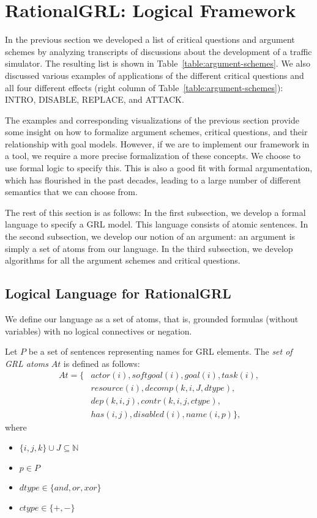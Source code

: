 \section{RationalGRL: Logical Framework}
\label{sect:formalframework}

In the previous section we developed a list of critical questions and argument schemes by analyzing transcripts of discussions about the development of a traffic simulator. The resulting list is shown in Table~\ref{table:argument-schemes}. We also discussed various examples of applications of the different critical questions and all four different effects (right column of Table~\ref{table:argument-schemes}): \textsf{INTRO}, \textsf{DISABLE}, \textsf{REPLACE}, and \textsf{ATTACK}.

The examples and corresponding visualizations of the previous section provide some insight on how to formalize argument schemes, critical questions, and their relationship with goal models. However, if we are to implement our framework in a tool, we require a more precise formalization of these concepts.  We choose to use formal logic to specify this. This is also a good fit with formal argumentation, which has flourished in the past decades, leading to a large number of different semantics that we can choose from.

The rest of this section is as follows: In the first subsection, we develop a formal language to specify a GRL model. This language consists of atomic sentences. In the second subsection, we develop our notion of an argument: an argument is simply a set of atoms from our language. In the third subsection, we develop algorithms for all the argument schemes and critical questions.

\subsection{Logical Language for RationalGRL}
\label{sect:goalmodeling:logicallanguage}

We define our language as a set of atoms, that is, grounded formulas (without variables) with no logical connectives or negation.

\begin{definition}
Let $P$ be a set of sentences representing names for GRL elements. The \emph{set of GRL atoms} $At$ is defined as follows: 
\begin{align*}
At = \{&actor(i), softgoal(i), goal(i), task(i),\\
&resource(i), decomp(k,i,J,dtype),\\
&dep(k,i,j),contr(k,i,j,ctype),\\
&has(i,j),disabled(i),name(i,p)\},
\end{align*}
where
\begin{itemize}
\item $\{i,j,k\}\cup J \subseteq\mathbb{N}$
\item $p\in P$
\item $dtype\in\{and,or,xor\}$
\item $ctype\in\{+,-\}$
\end{itemize}
\end{definition}


